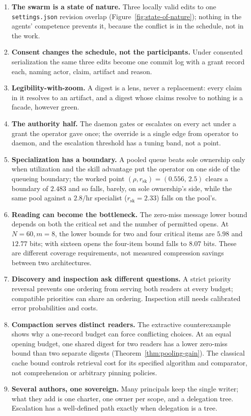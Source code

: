 \documentclass[11pt,a4paper]{article}
\theoremstyle{definition}
\theoremstyle{plain}
\begin{document}
\begin{enumerate}[leftmargin=1.6em,itemsep=2pt]
\item \textbf{The swarm is a state of nature.} Three locally valid edits to one \texttt{settings.json} revision overlap (Figure~\ref{fig:state-of-nature}); nothing in the agents' competence prevents it, because the conflict is in the schedule, not in the work.
\item \textbf{Consent changes the schedule, not the participants.} Under consented serialization the same three edits become one commit log with a grant record each, naming actor, claim, artifact and reason.
\item \textbf{Legibility-with-zoom.} A digest is a lens, never a replacement: every claim in it resolves to an artifact, and a digest whose claims resolve to nothing is a facade, however green.
\item \textbf{The authority half.} The daemon gates or escalates on every act under a grant the operator gave once; the override is a single edge from operator to daemon, and the escalation threshold has a tuning band, not a point.
\item \textbf{Specialization has a boundary.} A pooled queue beats sole ownership only when utilization and the skill advantage put the operator on one side of the queueing boundary; the worked point $(\rho,r_{\mathrm{sk}})=(0.556,\,2.5)$ clears a boundary of $2.483$ and so falls, barely, on sole ownership's side, while the same pool against a $2.8/\text{hr}$ specialist ($r_{\mathrm{sk}}=2.33$) falls on the pool's.
\item \textbf{Reading can become the bottleneck.} The zero-miss message
lower bound depends on both the critical set and the number of permitted opens. At
$N=60,m=8$, the lower bounds for two and four critical items are $5.98$ and
$12.77$ bits; with sixteen opens the four-item bound falls to $8.07$ bits.
These are different coverage requirements, not measured compression savings
between two architectures.
\item \textbf{Discovery and inspection ask different questions.} A strict
priority reversal prevents one ordering from serving both readers at every
budget; compatible priorities can share an ordering. Inspection still needs
calibrated error probabilities and costs.
\item \textbf{Compaction serves distinct readers.} The extractive
counterexample shows why a one-record budget can force conflicting choices.
At an equal opening budget, one shared digest for two readers has a lower
zero-miss bound than two separate digests (Theorem~\ref{thm:pooling-gain}). The classical
cache bound controls retrieval cost for its specified algorithm and comparator,
not comprehension or arbitrary pinning policies.
\item \textbf{Several authors, one sovereign.} Many principals keep the single
writer; what they add is one charter, one owner per scope, and a delegation
tree. Escalation has a well-defined path exactly when delegation is a tree.
\end{enumerate}
\end{document}
